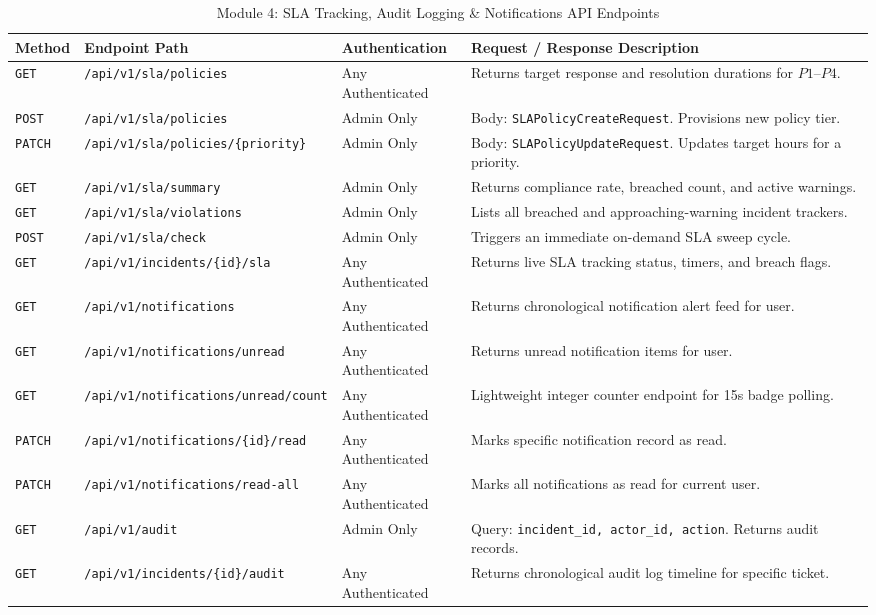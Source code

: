 \documentclass[11pt,a4paper,oneside]{report}
\begin{document}
\begin{table}[H]
\centering
\scriptsize
\caption{Module 4: SLA Tracking, Audit Logging \& Notifications API Endpoints}
\label{tab:app_routes_m4}
\begin{tabular}{p{1.2cm}p{5.5cm}p{2.5cm}p{5.0cm}}
\toprule
\textbf{Method} & \textbf{Endpoint Path} & \textbf{Authentication} & \textbf{Request / Response Description} \\
\midrule
\texttt{GET} & \texttt{/api/v1/sla/policies} & Any Authenticated & Returns target response and resolution durations for $P1$--$P4$. \\
\texttt{POST} & \texttt{/api/v1/sla/policies} & Admin Only & Body: \texttt{SLAPolicyCreateRequest}. Provisions new policy tier. \\
\texttt{PATCH} & \texttt{/api/v1/sla/policies/\{priority\}} & Admin Only & Body: \texttt{SLAPolicyUpdateRequest}. Updates target hours for a priority. \\
\texttt{GET} & \texttt{/api/v1/sla/summary} & Admin Only & Returns compliance rate, breached count, and active warnings. \\
\texttt{GET} & \texttt{/api/v1/sla/violations} & Admin Only & Lists all breached and approaching-warning incident trackers. \\
\texttt{POST} & \texttt{/api/v1/sla/check} & Admin Only & Triggers an immediate on-demand SLA sweep cycle. \\
\texttt{GET} & \texttt{/api/v1/incidents/\{id\}/sla} & Any Authenticated & Returns live SLA tracking status, timers, and breach flags. \\
\texttt{GET} & \texttt{/api/v1/notifications} & Any Authenticated & Returns chronological notification alert feed for user. \\
\texttt{GET} & \texttt{/api/v1/notifications/unread} & Any Authenticated & Returns unread notification items for user. \\
\texttt{GET} & \texttt{/api/v1/notifications/unread/count}& Any Authenticated & Lightweight integer counter endpoint for 15s badge polling. \\
\texttt{PATCH} & \texttt{/api/v1/notifications/\{id\}/read} & Any Authenticated & Marks specific notification record as read. \\
\texttt{PATCH} & \texttt{/api/v1/notifications/read-all} & Any Authenticated & Marks all notifications as read for current user. \\
\texttt{GET} & \texttt{/api/v1/audit} & Admin Only & Query: \texttt{incident\_id, actor\_id, action}. Returns audit records. \\
\texttt{GET} & \texttt{/api/v1/incidents/\{id\}/audit} & Any Authenticated & Returns chronological audit log timeline for specific ticket. \\
\bottomrule
\end{tabular}
\end{table}
\end{document}
